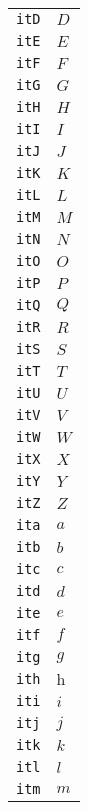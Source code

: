 \begin{longtable}{ll}
\texttt{itD}&${}{\textit{D}}{}$\\
\texttt{itE}&${}{\textit{E}}{}$\\
\texttt{itF}&${}{\textit{F}}{}$\\
\texttt{itG}&${}{\textit{G}}{}$\\
\texttt{itH}&${}{\textit{H}}{}$\\
\texttt{itI}&${}{\textit{I}}{}$\\
\texttt{itJ}&${}{\textit{J}}{}$\\
\texttt{itK}&${}{\textit{K}}{}$\\
\texttt{itL}&${}{\textit{L}}{}$\\
\texttt{itM}&${}{\textit{M}}{}$\\
\texttt{itN}&${}{\textit{N}}{}$\\
\texttt{itO}&${}{\textit{O}}{}$\\
\texttt{itP}&${}{\textit{P}}{}$\\
\texttt{itQ}&${}{\textit{Q}}{}$\\
\texttt{itR}&${}{\textit{R}}{}$\\
\texttt{itS}&${}{\textit{S}}{}$\\
\texttt{itT}&${}{\textit{T}}{}$\\
\texttt{itU}&${}{\textit{U}}{}$\\
\texttt{itV}&${}{\textit{V}}{}$\\
\texttt{itW}&${}{\textit{W}}{}$\\
\texttt{itX}&${}{\textit{X}}{}$\\
\texttt{itY}&${}{\textit{Y}}{}$\\
\texttt{itZ}&${}{\textit{Z}}{}$\\
\texttt{ita}&${}{\textit{a}}{}$\\
\texttt{itb}&${}{\textit{b}}{}$\\
\texttt{itc}&${}{\textit{c}}{}$\\
\texttt{itd}&${}{\textit{d}}{}$\\
\texttt{ite}&${}{\textit{e}}{}$\\
\texttt{itf}&${}{\textit{f}}{}$\\
\texttt{itg}&${}{\textit{g}}{}$\\
\texttt{ith}&${}{\textit{h}}{}$\\
\texttt{iti}&${}{\textit{i}}{}$\\
\texttt{itj}&${}{\textit{j}}{}$\\
\texttt{itk}&${}{\textit{k}}{}$\\
\texttt{itl}&${}{\textit{l}}{}$\\
\texttt{itm}&${}{\textit{m}}{}$\\

\end{longtable}
